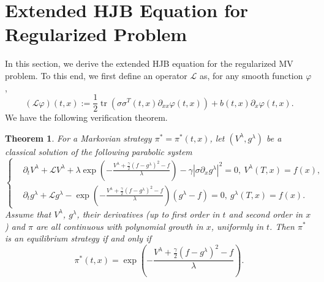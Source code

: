 \documentclass[11pt]{article}
\newtheorem{theorem}{Theorem}[section]
\begin{document}
\section{Extended HJB Equation for Regularized Problem}
In this section, we derive the extended HJB equation for the regularized  MV problem. To this end, we first define an operator $\mathcal L$ as, for any smooth function $\varphi$, 
$$
(\mathcal L \varphi)(t,x):=\frac{1}{2}\mathop{\text{tr}}( \sigma\sigma^T(t,x)\partial_{xx}\varphi(t,x))+ b(t,x) \partial_x \varphi(t,x).
$$
We have the following verification theorem. 
\begin{theorem}\label{thm_equil} 
For a Markovian strategy $\pi^*=\pi^*(t,x)$,  let $(V^\lambda,g^\lambda)$ be a classical solution of the following parabolic system 
\begin{equation}\label{extended-HJB}
	\left\{
	\begin{split}
		&\partial_t V^\lambda+\mathcal LV^\lambda+\lambda\exp(-\frac{V^\lambda+\frac{\gamma}{2}(f-g^\lambda)^2-f}{\lambda})-\gamma |\sigma \partial_x g^\lambda|^2=0,\ V^\lambda(T,x)=f(x),\\
		& \partial_t g^\lambda+\mathcal L g^\lambda-\exp(-\frac{V^\lambda+\frac{\gamma}{2}(f-g^\lambda)^2-f}{\lambda})(g^\lambda-f)=0,\ g^\lambda(T,x)=f(x).
	\end{split}
	\right.
\end{equation}
Assume that $V^\lambda$,  $g^\lambda$, their derivatives (up to first order in $t$ and  second order in $x$) and $\pi$ are all continuous with polynomial growth in $x$, uniformly  in $t$. Then $\pi^*$ is an equilibrium strategy if and only if
\begin{equation}\label{condi_optim}
	\pi^*(t,x)=\exp(-\frac{V^\lambda+\frac{\gamma}{2}(f-g^\lambda)^2-f}{\lambda}).
\end{equation}
\end{theorem}
\end{document}

